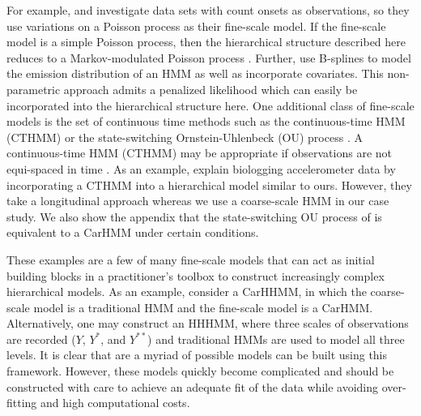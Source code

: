 For example, \citet{Bebbington:2007} and \citet{Borchers:2013} investigate data sets with count onsets as observations, so they use variations on a Poisson process as their fine-scale model. If the fine-scale model is a simple Poisson process, then the hierarchical structure described here reduces to a Markov-modulated Poisson process \citep{Fischer:1993}.
Further, \citep{Langrock:2018} use B-splines to model the emission distribution of an HMM as well as incorporate covariates. This non-parametric approach admits a penalized likelihood which can easily be incorporated into the hierarchical structure here. 
One additional class of fine-scale models is the set of continuous time methods such as the continuous-time HMM (CTHMM) \citep{Liu:2015} or the state-switching Ornstein-Uhlenbeck (OU) process \citep{Michelot:2019}. 
A continuous-time HMM (CTHMM) may be appropriate if observations are not equi-spaced in time \citep{Liu:2015}. As an example, \citet{Xu:2018} explain biologging accelerometer data by incorporating a CTHMM into a hierarchical model similar to ours. However, they take a longitudinal approach whereas we use a coarse-scale HMM in our case study. We also show the appendix that the state-switching OU process of \citet{Michelot:2019} is equivalent to a CarHMM under certain conditions.

These examples are a few of many fine-scale models that can act as initial building blocks in a practitioner's toolbox to construct increasingly complex hierarchical models. As an example, consider a CarHHMM, in which the coarse-scale model is a traditional HMM and the fine-scale model is a CarHMM. Alternatively, one may construct an HHHMM, where three scales of observations are recorded ($Y$, $Y^*$, and $Y^{**}$) and traditional HMMs are used to model all three levels. It is clear that are a myriad of possible models can be built using this framework. However, these models quickly become complicated and should be constructed with care to achieve an adequate fit of the data while avoiding over-fitting and high computational costs.